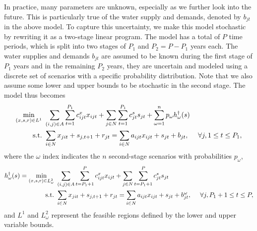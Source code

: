 \documentclass[12pt]{amsart}
\newcommand{\st}{\mbox{s.t.}}
\begin{document}
In practice, many parameters are unknown, especially as we further look into the future. 
This is particularly true of the water supply and demands, denoted by $b_{jt}$ in the above model. 
To capture this uncertainty, we make this model stochastic by rewriting it as a two-stage linear program.
The model has a total of $P$ time periods, which is split into two stages of $P_1$ and $P_2 = P - P_1$ years each. 
The water supplies and demands $b_{jt}$ are assumed to be known during the first stage of $P_1$ years and in the remaining $P_2$ years, they are uncertain and modeled using a discrete set of scenarios with a specific probability distribution.  
Note that we also assume some lower and upper bounds to be stochastic in the second stage. 
The model thus becomes
\begin{align}
	\min_{(x,s,r) \in L^1} \ & \sum_{(i,j) \in A} \sum_{t=1}^{P_1} c_{ijt}^x x_{ijt} + \sum_{j \in N} \sum_{t=1}^{P_1} c_{jt}^s s_{jt} + \sum_{\omega=1}^n p_\omega h^\dagger_\omega(s) \label{eq:gen_network_two_stage} \\
	\st \ & \sum_{i \in N} x_{jit} + s_{j,t+1} + r_{jt} = \sum_{i \in N} a_{ijt} x_{ijt} + s_{jt} + b_{jt},\ \ \ \ \forall j, 1 \leq t \leq P_1, \notag
\end{align}
where the $\omega$ index indicates the $n$ second-stage scenarios with probabilities $p_\omega$,
\begin{align}
	h^\dagger_\omega(s) = \min_{(x,s,r) \in L^2_\omega} \ & \sum_{(i,j) \in A} \sum_{t=P_1+1}^{P} c_{ijt}^x x_{ijt} + \sum_{j \in N} \sum_{t=P_1+1}^{P} c_{jt}^s s_{jt} \label{eq:gen_network_second_stage} \\
	\st \ & \sum_{i \in N} x_{jit} + s_{j,t+1} + r_{jt} = \sum_{i \in N} a_{ijt} x_{ijt} + s_{jt} + b_{jt}^\omega, \ \ \ \ \forall j, P_1+1 \leq t \leq P, \notag
\end{align}
and $L^1$ and $L^2_\omega$ represent the feasible regions defined by the lower and upper variable bounds.
\end{document}
